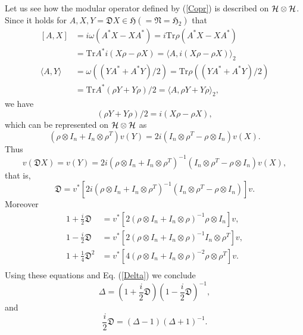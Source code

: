 \documentclass{article}
\begin{document}
Let us see how the modular operator defined by  (\ref{Copr}) is described on $\cal{H}\otimes \cal{H}$.
Since it holds for $A,X,Y=\mathfrak{D}X\in \mathfrak{H}(=\mathfrak{N}=\mathfrak{H}_2)$
that 
 \begin{equation}
 \begin{split}
 [A,X]&=i\omega(A^\ast X-XA^\ast)=i\mbox{Tr}\rho(A^\ast X-XA^\ast)\\
      &=\mbox{Tr}A^\ast i(X\rho-\rho X)=\langle A, i(X\rho-\rho X)\rangle_2\\
 \langle A,Y\rangle&=\omega((YA^\ast+A^\ast Y)/2)=\mbox{Tr}\rho((YA^\ast+A^\ast Y)/2)\\
 &=\mbox{Tr}A^\ast(\rho Y+Y\rho)/2=\langle A, \rho Y+Y\rho \rangle_2,
 \end{split}
 \end{equation}
  we have
 $$
 (\rho Y+Y\rho)/2=i(X\rho-\rho X),
 $$
 which can be represented on $\cal{H}\otimes \cal{H}$ as
	$$
	(\rho\otimes I_n+I_n\otimes \rho^T )v(Y)=2i(I_n\otimes \rho^T-\rho\otimes I_n)v(X).
	$$
	Thus 
	$$
	v(\mathfrak{D}X)=v(Y)=2i(\rho\otimes I_n+I_n\otimes \rho^T )^{-1}(I_n\otimes \rho^T -\rho\otimes I_n )v(X),
	$$
	that is,
	$$
	\mathfrak{D}=v^\ast[ 2i( \rho\otimes I_n+I_n\otimes \rho^T )^{-1}(I_n\otimes \rho^T -\rho\otimes I_n )]v.
	$$
	  Moreover
	\begin{equation}  
		\begin{split}
    1+\frac{i}{2}\mathfrak{D}&=v^\ast [ 2(\rho\otimes I_n+I_n\otimes \rho)^{-1}  \rho \otimes I_n]v,\\
    1-\frac{i}{2}\mathfrak{D}&=v^\ast [ 2(\rho\otimes I_n+I_n\otimes \rho)^{-1}I_n \otimes \rho^T]v,\\
    1+\frac{1}{4}\mathfrak{D}^2&=v^\ast[ 4(\rho\otimes I_n+I_n\otimes \rho)^{-2}\rho \otimes \rho^T]v.\\
    \end{split}
	\end{equation}
Using these equations and Eq. (\ref{Delta})  we conclude
		$$
    \Delta=\left(1+\frac{i}{2}\mathfrak{D}\right)\left(1-\frac{i}{2}\mathfrak{D}\right)^{-1},
		$$
		and
		$$
     \frac{i}{2}\mathfrak{D}=(\Delta-1)(\Delta+1)^{-1}.
		$$
\end{document}
